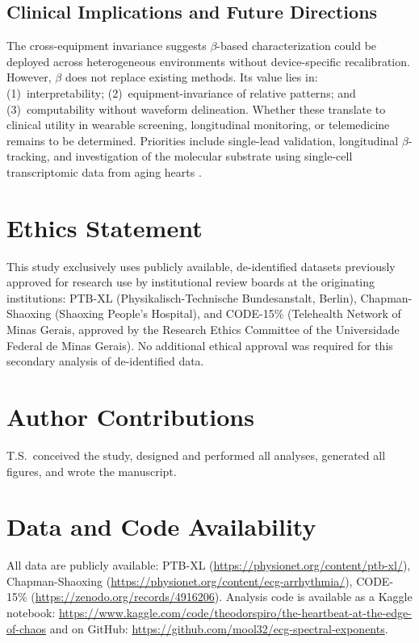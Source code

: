 \documentclass[11pt,a4paper]{article}
\begin{document}
\subsection{Clinical Implications and Future Directions}
The cross-equipment invariance suggests $\beta$-based characterization could be deployed across heterogeneous environments without device-specific recalibration. However, $\beta$ does not replace existing methods. Its value lies in: (1)~interpretability; (2)~equipment-invariance of relative patterns; and (3)~computability without waveform delineation.
Whether these translate to clinical utility in wearable screening, longitudinal monitoring, or telemedicine remains to be determined. Priorities include single-lead validation, longitudinal $\beta$-tracking, and investigation of the molecular substrate using single-cell transcriptomic data from aging hearts \citep{TabulaMuris2020}.
\section*{Ethics Statement}
This study exclusively uses publicly available, de-identified datasets previously approved for research use by institutional review boards at the originating institutions: PTB-XL (Physikalisch-Technische Bundesanstalt, Berlin), Chapman-Shaoxing (Shaoxing People's Hospital), and CODE-15\% (Telehealth Network of Minas Gerais, approved by the Research Ethics Committee of the Universidade Federal de Minas Gerais). No additional ethical approval was required for this secondary analysis of de-identified data.
\section*{Author Contributions}
T.S.\ conceived the study, designed and performed all analyses, generated all figures, and wrote the manuscript.
\section*{Data and Code Availability}
All data are publicly available: PTB-XL (\url{https://physionet.org/content/ptb-xl/}), Chapman-Shaoxing (\url{https://physionet.org/content/ecg-arrhythmia/}), CODE-15\% (\url{https://zenodo.org/records/4916206}). Analysis code is available as a Kaggle notebook: \url{https://www.kaggle.com/code/theodorspiro/the-heartbeat-at-the-edge-of-chaos} and on GitHub: \url{https://github.com/mool32/ecg-spectral-exponents}.
\end{document}
